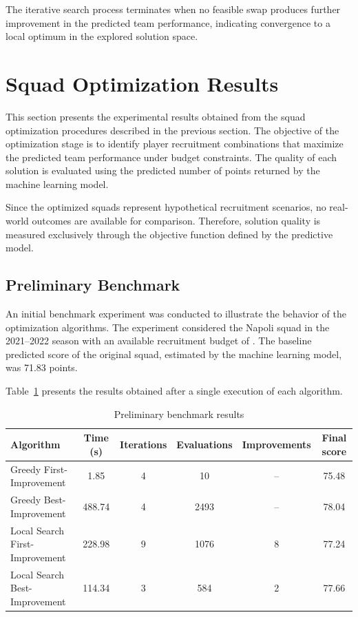 \documentclass[12pt]{article}
\begin{document}
The iterative search process terminates when no feasible swap produces further improvement in the predicted team performance, indicating convergence to a local
optimum in the explored solution space.

\section{Squad Optimization Results}

This section presents the experimental results obtained from the squad optimization procedures described in the previous section. The objective
of the optimization stage is to identify player recruitment combinations that maximize the predicted team performance under budget constraints.
The quality of each solution is evaluated using the predicted number of points returned by the machine learning model.

Since the optimized squads represent hypothetical recruitment scenarios, no real-world outcomes are available for comparison. Therefore, solution
quality is measured exclusively through the objective function defined by the predictive model.

\subsection{Preliminary Benchmark}

An initial benchmark experiment was conducted to illustrate the behavior of the optimization algorithms. The experiment considered the Napoli
squad in the 2021--2022 season with an available recruitment budget of . The baseline predicted score of the original squad, 
estimated by the machine learning model, was 71.83 points.

Table~\ref{tab:benchmark_inicial} presents the results obtained after a single execution of each algorithm.

\begin{table}[htbp]
\centering
\caption{Preliminary benchmark results}
\label{tab:benchmark_inicial}
\begin{tabular}{lccccc}
\toprule
Algorithm & Time (s) & Iterations & Evaluations & Improvements & Final score \\
\midrule
Greedy First-Improvement & 1.85 & 4 & 10 & -- & 75.48 \\
Greedy Best-Improvement & 488.74 & 4 & 2493 & -- & 78.04 \\
Local Search First-Improvement & 228.98 & 9 & 1076 & 8 & 77.24 \\
Local Search Best-Improvement & 114.34 & 3 & 584 & 2 & 77.66 \\
\bottomrule
\end{tabular}
\end{table}
\end{document}
